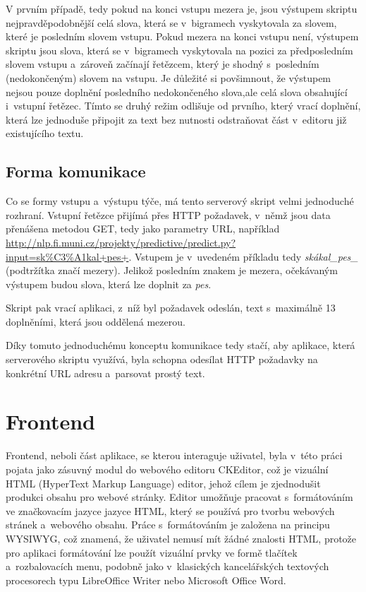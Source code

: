 \documentclass[a4paper,11pt,openany]{book} %
\begin{document}
V prvním případě, tedy pokud na konci vstupu mezera je, jsou výstupem skriptu nejpravděpodobnější celá slova, která se v~bigramech vyskytovala za slovem, které je posledním slovem vstupu. Pokud mezera na konci vstupu není, výstupem skriptu jsou slova, která se v~bigramech vyskytovala na pozici za předposledním slovem vstupu a~zároveň začínají řetězcem, který je shodný s~posledním (nedokončeným) slovem na vstupu. Je důležité si povšimnout, že výstupem nejsou pouze doplnění posledního nedokončeného slova,ale celá slova obsahující i~vstupní řetězec. Tímto se druhý režim odlišuje od prvního, který vrací doplnění, která lze jednoduše připojit za text bez nutnosti odstraňovat část v~editoru již existujícího textu.

\subsection{Forma komunikace}

Co se formy vstupu a~výstupu týče, má tento serverový skript velmi jednoduché rozhraní. Vstupní řetězce přijímá přes HTTP požadavek, v~němž jsou data přenášena metodou GET, tedy jako parametry URL, například \url{http://nlp.fi.muni.cz/projekty/predictive/predict.py?input=sk%C3%A1kal+pes+}. Vstupem je v~uvedeném příkladu tedy {\it skákal\_pes\_} (podtržítka značí mezery). Jelikož posledním znakem je mezera, očekávaným výstupem budou slova, která lze doplnit za {\it pes}. 

Skript pak vrací aplikaci, z~níž byl požadavek odeslán, text s~maximálně 13 doplněními, která jsou oddělená mezerou.

Díky tomuto jednoduchému konceptu komunikace tedy stačí, aby aplikace, která serverového skriptu využívá, byla schopna odesílat HTTP požadavky na konkrétní URL adresu a~parsovat prostý text. 

\section{Frontend}

Frontend, neboli část aplikace, se kterou interaguje uživatel, byla v~této práci pojata jako zásuvný modul do webového editoru CKEditor, což je vizuální HTML (HyperText Markup Language) editor, jehož cílem je zjednodušit produkci obsahu pro webové stránky. Editor umožňuje pracovat s~formátováním ve značkovacím jazyce jazyce HTML, který se používá pro tvorbu webových stránek a~webového obsahu. Práce s~formátováním je založena na principu WYSIWYG, což znamená, že uživatel nemusí mít žádné znalosti HTML, protože pro aplikaci formátování lze použít vizuální prvky ve formě tlačítek a~rozbalovacích menu, podobně jako v~klasických kancelářských textových procesorech typu LibreOffice Writer nebo Microsoft Office Word.
\end{document}
